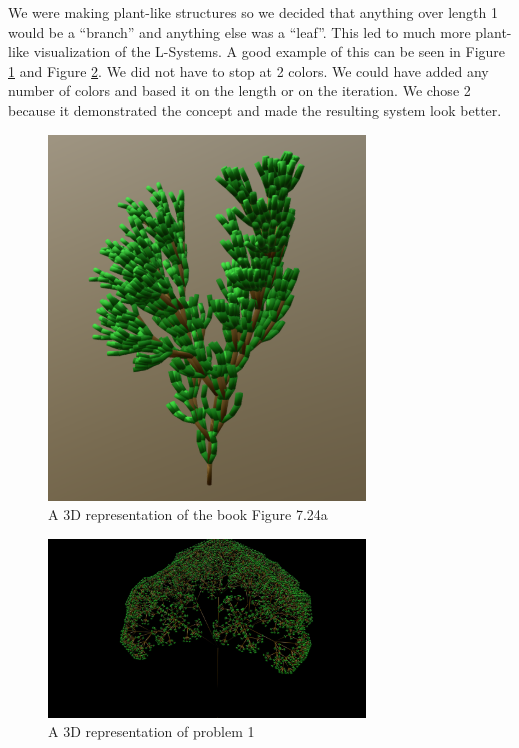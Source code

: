 We were making plant-like structures so we decided that anything over length 1 
would be a ``branch'' and anything else was a ``leaf''. This led to much more 
plant-like visualization of the L-Systems. A good example of this can be seen 
in Figure \ref{fig:a_3d} and Figure \ref{fig:prob1_3d}. We did not have to stop 
at 2 colors. We could have added any number of colors and based it on the 
length or on the iteration. We chose 2 because it demonstrated the concept and 
made the resulting system look better.

\begin{figure}[H]
\centering
\noindent\includegraphics[width=0.75\textwidth]{figures/L-systems/a3d}
\caption[3D L-system Example]{A 3D representation of the book Figure 7.24a}
\label{fig:a_3d}
\end{figure}

\begin{figure}[H]
\centering
\noindent\includegraphics[width=0.75\textwidth]{figures/L-systems/prob13d}
\caption[3D Representation of Problem 1]{A 3D representation of problem 1}
\label{fig:prob1_3d}
\end{figure}

